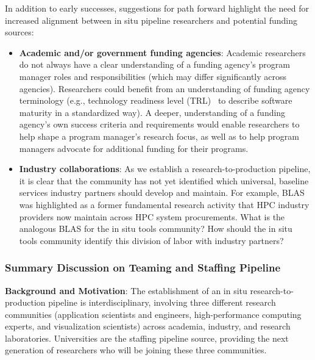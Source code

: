 \begin{refsection}
In addition to early successes, suggestions for path forward highlight the need for increased alignment between in situ pipeline researchers and potential funding sources:
 \begin{itemize}
\item \textbf{Academic and/or government funding agencies}: Academic researchers do not always have a clear understanding of a funding agency’s program manager roles and responsibilities (which may differ significantly across agencies).  Researchers could benefit from an understanding of funding agency terminology (e.g., technology readiness level (TRL)~\cite{TRL} to describe software maturity in a standardized way).  A deeper, understanding of a funding agency’s own success criteria and requirements would enable researchers to help shape a program manager’s research focus, as well as to help program managers  advocate for additional  funding for their programs.
 \item \textbf{Industry collaborations}:  As we establish a research-to-production pipeline, it is clear that the community has not yet identified which universal, baseline services industry partners should develop and maintain.  For example, BLAS was highlighted as a former fundamental research activity that HPC industry providers now maintain across HPC system procurements.  What is the analogous BLAS for the in situ tools community? How should the in situ tools community identify this division of labor with industry partners?
\end{itemize}

\printbibliography	
\end{refsection}


\subsubsection{Summary Discussion on Teaming and Staffing Pipeline}

\textbf{Background and Motivation}: 
The establishment of an in situ research-to-production pipeline is interdisciplinary, involving three different research communities (application scientists and engineers, high-performance computing experts, and visualization scientists)  across academia, industry, and research laboratories.  Universities are the staffing pipeline source, providing the next generation of researchers who will be joining these three communities. 

